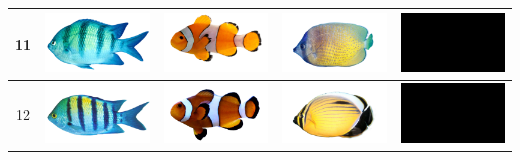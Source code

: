\begin{longtable}{|c|c|c|c|c|}
    11 & \includegraphics[width=3cm]{gambar/abudefduf/A11} & \includegraphics[width=3cm]{gambar/amphiprion/A11} & \includegraphics[width=3cm]{gambar/chaetodon/C11} & \includegraphics[width=3cm]{gambar/negative_examples/N11} \\
    \hline
    12 & \includegraphics[width=3cm]{gambar/abudefduf/A12} & \includegraphics[width=3cm]{gambar/amphiprion/A12} & \includegraphics[width=3cm]{gambar/chaetodon/C12} & \includegraphics[width=3cm]{gambar/negative_examples/N12} \\
    \hline

\end{longtable}
